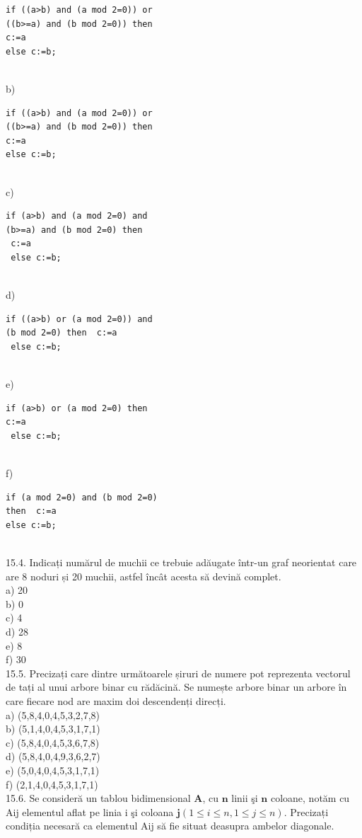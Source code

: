 {{\begin{verbatim}
if ((a>b) and (a mod 2=0)) or 
((b>=a) and (b mod 2=0)) then  
c:=a 
else c:=b;
\end{verbatim}
\\
b) \begin{verbatim}
if ((a>b) and (a mod 2=0)) or 
((b>=a) and (b mod 2=0)) then  
c:=a 
else c:=b;
\end{verbatim}
\\
c) \begin{verbatim}
if (a>b) and (a mod 2=0) and 
(b>=a) and (b mod 2=0) then 
 c:=a 
 else c:=b;
\end{verbatim}
\\
d) \begin{verbatim}
if ((a>b) or (a mod 2=0)) and 
(b mod 2=0) then  c:=a 
 else c:=b; 
\end{verbatim}
\\
e) \begin{verbatim}
if (a>b) or (a mod 2=0) then  
c:=a 
 else c:=b; 
\end{verbatim}
\\
f) \begin{verbatim}
if (a mod 2=0) and (b mod 2=0) 
then  c:=a  
else c:=b;
\end{verbatim}
\\
15.4. Indicați numărul de muchii ce trebuie adăugate într-un graf neorientat care are 8 noduri și 20 muchii, astfel încât acesta să devină complet.
\\
a) 20
\\
b) 0
\\
c) 4
\\
d) 28
\\
e) 8
\\
f) 30
\\
15.5. Precizați care dintre următoarele șiruri de numere pot reprezenta vectorul de tați al unui arbore binar cu rădăcină. Se numește arbore binar un arbore în care fiecare nod are maxim doi descendenți direcți.
\\
a) (5,8,4,0,4,5,3,2,7,8)
\\
b) (5,1,4,0,4,5,3,1,7,1)
\\
c) (5,8,4,0,4,5,3,6,7,8)
\\
d) (5,8,4,0,4,9,3,6,2,7)
\\
e) (5,0,4,0,4,5,3,1,7,1)
\\
f) (2,1,4,0,4,5,3,1,7,1)
\\
15.6. Se consideră un tablou bidimensional $\mathbf{A}$, cu $\mathbf{n}$ linii şi $\mathbf{n}$ coloane, notăm cu Aij elementul aflat pe linia i şi coloana $\mathbf{j}(1 \leq i \leq n, 1 \leq j \leq n)$. Precizați condiția necesară ca elementul Aij să fie situat deasupra ambelor diagonale.
}}
